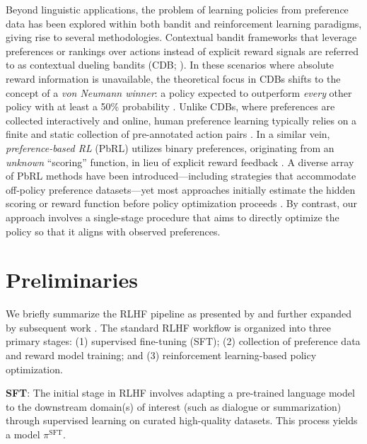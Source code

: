 Beyond linguistic applications, the problem of learning policies from preference data has been explored within both bandit and reinforcement learning paradigms, giving rise to several methodologies. Contextual bandit frameworks that leverage preferences or rankings over actions instead of explicit reward signals are referred to as contextual dueling bandits (CDB; \cite{yue2012karmed,dudik2015contextual}). In these scenarios where absolute reward information is unavailable, the theoretical focus in CDBs shifts to the concept of a \textit{von Neumann winner}: a policy expected to outperform \textit{every} other policy with at least a 50\% probability \citep{dudik2015contextual}. Unlike CDBs, where preferences are collected interactively and online, human preference learning typically relies on a finite and static collection of pre-annotated action pairs \citep{yan2022human}. In a similar vein, \textit{preference-based RL} (PbRL) utilizes binary preferences, originating from an \textit{unknown} “scoring” function, in lieu of explicit reward feedback \citep{BusaFekete2014,ruiz2023dueling}. A diverse array of PbRL methods have been introduced—including strategies that accommodate off-policy preference datasets—yet most approaches initially estimate the hidden scoring or reward function before policy optimization proceeds \citep{jain2013learning,BusaFekete2014,christiano2017deep,sadigh2017active,kupcsik2018learning}. By contrast, our approach involves a single-stage procedure that aims to directly optimize the policy so that it aligns with observed preferences.

\section{Preliminaries}\label{section:prelims}

We briefly summarize the RLHF pipeline as presented by \citeauthor{ziegler2020finetuning} and further expanded by subsequent work \citep{stiennon2022learning, bai2022training, ouyang2022training}. The standard RLHF workflow is organized into three primary stages: (1) supervised fine-tuning (SFT); (2) collection of preference data and reward model training; and (3) reinforcement learning-based policy optimization.

\textbf{SFT}: The initial stage in RLHF involves adapting a pre-trained language model to the downstream domain(s) of interest (such as dialogue or summarization) through supervised learning on curated high-quality datasets. This process yields a model $\pi^\text{SFT}$.

